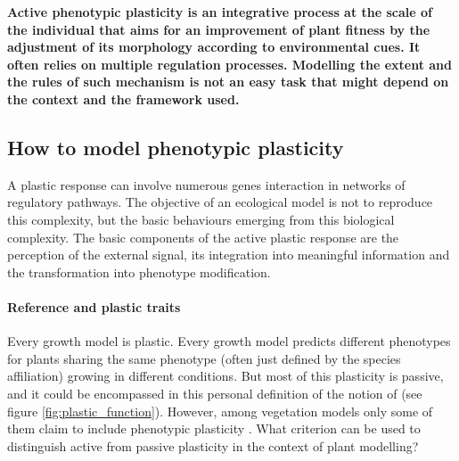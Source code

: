 \textbf{Active phenotypic plasticity is an integrative process at the scale of the individual that aims for an improvement of plant fitness by the adjustment of its morphology according to environmental cues. It often relies on multiple regulation processes. Modelling the extent and the rules of such mechanism is not an easy task that might depend on the context and the framework used.}

\subsection{How to model phenotypic plasticity}

A plastic response can involve numerous genes interaction in networks of regulatory pathways. The objective of an ecological model is not to reproduce this complexity, but the basic behaviours emerging from this biological complexity. The basic components of the active plastic response are the perception of the external signal, its integration into meaningful information and the transformation into phenotype modification.

\paragraph{Reference and plastic traits}

Every growth model is plastic. Every growth model predicts different phenotypes for plants sharing the same phenotype (often just defined by the species affiliation) growing in different conditions. But most of this plasticity is passive, and it could be encompassed in this personal definition of the notion of  (see figure \ref{fig:plastic_function}). However, among vegetation models only some of them claim to include phenotypic plasticity \parencite{maire_plasticity_2013}. What criterion can be used to distinguish active from passive plasticity in the context of plant modelling?

